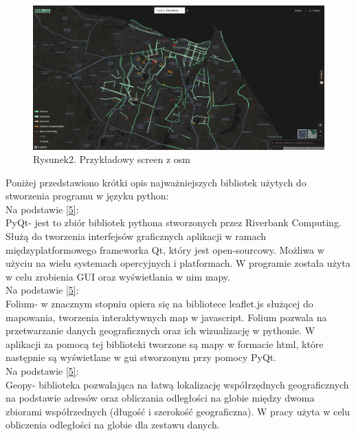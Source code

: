 \documentclass[a4paper, twoside, 12pt, justified]{article}
\begin{document}
 	\begin{figure}[h]
 	\includegraphics[scale=0.23]{osm_example}
 	\centering
 	\\
 	{Rysunek2. Przykładowy screen z osm}
	\end{figure}
	 
	 Poniżej przedstawiono krótki opis najważniejszych bibliotek użytych do stworzenia programu w języku python: \\
	 
	 
	 Na podstawie \hyperlink{pyqt}{[5]}:\\
	 PyQt- jest to zbiór bibliotek pythona stworzonych przez Riverbank Computing. Służą do tworzenia interfejsów graficznych aplikacji w ramach międzyplatformowego frameworka Qt, który jest open-sourcowy. Możliwa w użyciu na wielu systemach opercyjnych i platformach. W programie została użyta w celu zrobienia GUI oraz wyświetlania w nim mapy.\\
	 
	 
	 Na podstawie \hyperlink{folium}{[5]}:\\
	 Folium- w znacznym stopniu opiera się na bibliotece leaflet.js służącej do mapowania, tworzenia interaktywnych map w javascript. Folium pozwala na przetwarzanie danych geograficznych oraz ich wizualizację w pythonie. W aplikacji za pomocą tej biblioteki tworzone są mapy w formacie html, które następnie są wyświetlane w gui stworzonym przy pomocy PyQt.\\
	 
	 Na podstawie \hyperlink{geopy}{[5]}:\\
	 Geopy- biblioteka pozwalająca na łatwą lokalizację współrzędnych geograficznych na podstawie adresów oraz obliczania odległości na globie między dwoma zbiorami współrzednych (długość i szerokość geograficzna). W pracy użyta w celu obliczenia odległości na globie dla zestawu danych.\\
	 
\end{document}
